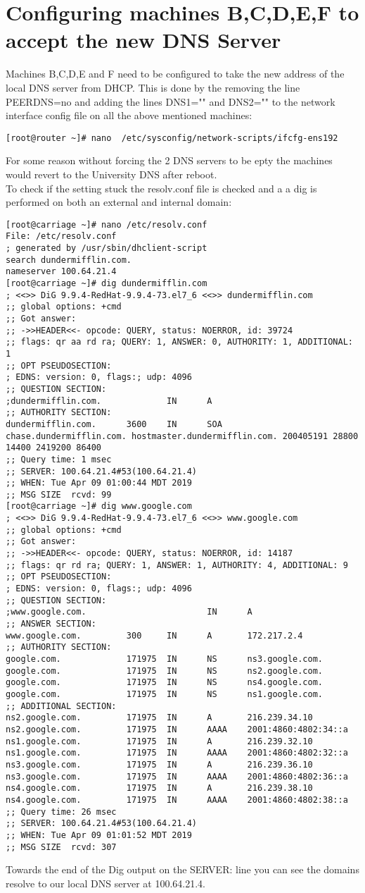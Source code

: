 \documentclass[11pt,onside]{article}
\begin{document}
\section{Configuring machines B,C,D,E,F to accept the new DNS Server}
Machines B,C,D,E and F need to be configured to take the new address of the local DNS server from DHCP. This is done by  the removing the line PEERDNS=no and adding the lines DNS1="" and DNS2="" to the network interface config file on all the above mentioned machines:
\begin{lstlisting}
[root@router ~]# nano  /etc/sysconfig/network-scripts/ifcfg-ens192
\end{lstlisting}
 For some reason without forcing the 2 DNS servers to be epty the machines would revert to the University DNS after reboot. \\
To check if the setting stuck the resolv.conf file is checked and a a dig is performed on both an external and internal domain:
\begin{lstlisting}
[root@carriage ~]# nano /etc/resolv.conf
File: /etc/resolv.conf
; generated by /usr/sbin/dhclient-script
search dundermifflin.com.
nameserver 100.64.21.4
[root@carriage ~]# dig dundermifflin.com
; <<>> DiG 9.9.4-RedHat-9.9.4-73.el7_6 <<>> dundermifflin.com
;; global options: +cmd
;; Got answer:
;; ->>HEADER<<- opcode: QUERY, status: NOERROR, id: 39724
;; flags: qr aa rd ra; QUERY: 1, ANSWER: 0, AUTHORITY: 1, ADDITIONAL: 1
;; OPT PSEUDOSECTION:
; EDNS: version: 0, flags:; udp: 4096
;; QUESTION SECTION:
;dundermifflin.com.             IN      A
;; AUTHORITY SECTION:
dundermifflin.com.      3600    IN      SOA     chase.dundermifflin.com. hostmaster.dundermifflin.com. 200405191 28800 14400 2419200 86400
;; Query time: 1 msec
;; SERVER: 100.64.21.4#53(100.64.21.4)
;; WHEN: Tue Apr 09 01:00:44 MDT 2019
;; MSG SIZE  rcvd: 99
[root@carriage ~]# dig www.google.com
; <<>> DiG 9.9.4-RedHat-9.9.4-73.el7_6 <<>> www.google.com
;; global options: +cmd
;; Got answer:
;; ->>HEADER<<- opcode: QUERY, status: NOERROR, id: 14187
;; flags: qr rd ra; QUERY: 1, ANSWER: 1, AUTHORITY: 4, ADDITIONAL: 9
;; OPT PSEUDOSECTION:
; EDNS: version: 0, flags:; udp: 4096
;; QUESTION SECTION:
;www.google.com.                        IN      A
;; ANSWER SECTION:
www.google.com.         300     IN      A       172.217.2.4
;; AUTHORITY SECTION:
google.com.             171975  IN      NS      ns3.google.com.
google.com.             171975  IN      NS      ns2.google.com.
google.com.             171975  IN      NS      ns4.google.com.
google.com.             171975  IN      NS      ns1.google.com.
;; ADDITIONAL SECTION:
ns2.google.com.         171975  IN      A       216.239.34.10
ns2.google.com.         171975  IN      AAAA    2001:4860:4802:34::a
ns1.google.com.         171975  IN      A       216.239.32.10
ns1.google.com.         171975  IN      AAAA    2001:4860:4802:32::a
ns3.google.com.         171975  IN      A       216.239.36.10
ns3.google.com.         171975  IN      AAAA    2001:4860:4802:36::a
ns4.google.com.         171975  IN      A       216.239.38.10
ns4.google.com.         171975  IN      AAAA    2001:4860:4802:38::a
;; Query time: 26 msec
;; SERVER: 100.64.21.4#53(100.64.21.4)
;; WHEN: Tue Apr 09 01:01:52 MDT 2019
;; MSG SIZE  rcvd: 307
\end{lstlisting}
Towards the end of the Dig output on the SERVER: line you can see the domains resolve to our local DNS server at 100.64.21.4.
\end{document}
